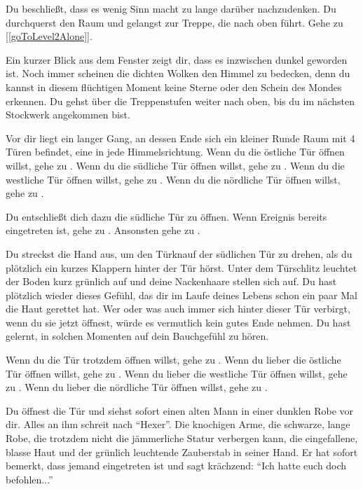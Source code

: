 Du beschließt, dass es wenig Sinn macht zu lange darüber nachzudenken. Du durchquerst den Raum und gelangst zur Treppe, die nach oben führt.
Gehe zu [\ref{goToLevel2Alone}].


Ein kurzer Blick aus dem Fenster zeigt dir, dass es inzwischen dunkel geworden ist. Noch immer scheinen die dichten Wolken den Himmel zu bedecken, denn du kannst in diesem flüchtigen Moment keine Sterne oder den Schein des Mondes erkennen.
Du gehst über die Treppenstufen weiter nach oben, bis du im nächsten Stockwerk angekommen bist.

Vor dir liegt ein langer Gang, an dessen Ende sich ein kleiner Runde Raum mit 4 Türen befindet, eine in jede Himmelsrichtung.
Wenn du die östliche Tür öffnen willst, gehe zu .
Wenn du die südliche Tür öffnen willst, gehe zu .
Wenn du die westliche Tür öffnen willst, gehe zu .
Wenn du die nördliche Tür öffnen willst, gehe zu .


Du entschließt dich dazu die südliche Tür zu öffnen.
Wenn Ereignis  bereits eingetreten ist, gehe zu . Ansonsten gehe zu .


Du streckst die Hand aus, um den Türknauf der südlichen Tür zu drehen, als du plötzlich ein kurzes Klappern hinter der Tür hörst. Unter dem Türschlitz leuchtet der Boden kurz grünlich auf und deine Nackenhaare stellen sich auf. Du hast plötzlich wieder dieses Gefühl, das dir im Laufe deines Lebens schon ein paar Mal die Haut gerettet hat. Wer oder was auch immer sich hinter dieser Tür verbirgt, wenn du sie jetzt öffnest, würde es vermutlich kein gutes Ende nehmen. Du hast gelernt, in solchen Momenten auf dein Bauchgefühl zu hören.

Wenn du die Tür trotzdem öffnen willst, gehe zu .
Wenn du lieber die östliche Tür öffnen willst, gehe zu .
Wenn du lieber die westliche Tür öffnen willst, gehe zu .
Wenn du lieber die nördliche Tür öffnen willst, gehe zu .


Du öffnest die Tür und siehst sofort einen alten Mann in einer dunklen Robe vor dir. Alles an ihm schreit nach ``Hexer''. Die knochigen Arme, die schwarze, lange Robe, die trotzdem nicht die jämmerliche Statur verbergen kann, die eingefallene, blasse Haut und der grünlich leuchtende Zauberstab in seiner Hand. Er hat sofort bemerkt, dass jemand eingetreten ist und sagt krächzend: ``Ich hatte euch doch befohlen...''

